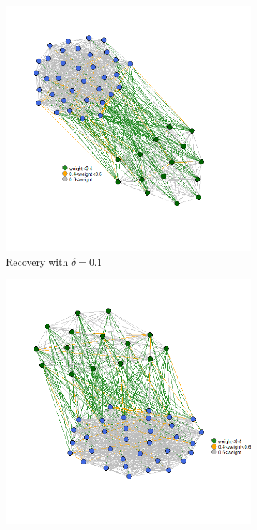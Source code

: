 \documentclass[12pt]{amsart}
\theoremstyle{remark}
\begin{document}
\begin{figure}[H]
\begin{subfigure}[b]{0.37\textwidth}
         \includegraphics[width=\textwidth]{./Pictures/recupera1.png}
         \caption{Recovery with $\delta=0.1$}
     \end{subfigure}
     \hfill
     \begin{subfigure}[b]{0.37\textwidth}
         \centering
         \includegraphics[width=\textwidth]{./Pictures/recupera2.png}

\end{subfigure}
\end{figure}
\end{document}
